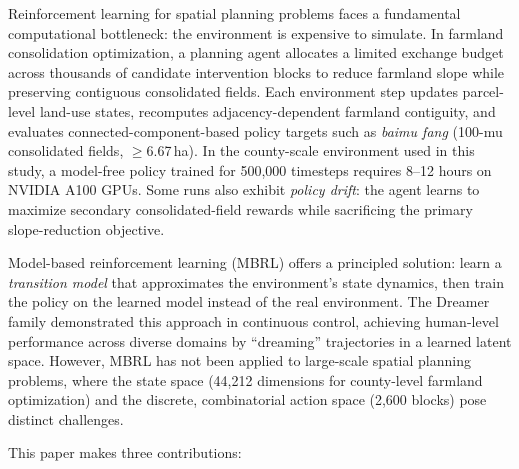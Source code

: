 \documentclass[11pt]{article}
\begin{document}
Reinforcement learning for spatial planning problems faces a fundamental computational bottleneck: the environment is expensive to simulate. In farmland consolidation optimization, a planning agent allocates a limited exchange budget across thousands of candidate intervention blocks to reduce farmland slope while preserving contiguous consolidated fields. Each environment step updates parcel-level land-use states, recomputes adjacency-dependent farmland contiguity, and evaluates connected-component-based policy targets such as \textit{baimu fang} (100-mu consolidated fields, $\geq$6.67\,ha). In the county-scale environment used in this study, a model-free policy trained for 500{,}000 timesteps requires 8--12 hours on NVIDIA A100 GPUs. Some runs also exhibit \textit{policy drift}: the agent learns to maximize secondary consolidated-field rewards while sacrificing the primary slope-reduction objective.

Model-based reinforcement learning (MBRL) offers a principled solution: learn a \textit{transition model} that approximates the environment's state dynamics, then train the policy on the learned model instead of the real environment. The Dreamer family \citep{hafner2023dreamerv3} demonstrated this approach in continuous control, achieving human-level performance across diverse domains by ``dreaming'' trajectories in a learned latent space. However, MBRL has not been applied to large-scale spatial planning problems, where the state space (44{,}212 dimensions for county-level farmland optimization) and the discrete, combinatorial action space (2{,}600 blocks) pose distinct challenges.

This paper makes three contributions:
\end{document}
